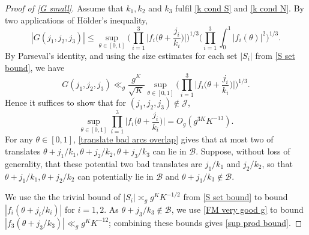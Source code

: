 \documentclass[hidelinks,11pt,reqno]{amsart}
\renewcommand{\leq}{\leqslant}
\newcommand{\fewnz}{\mathcal{B}}
\theoremstyle{remark}
\begin{document}
\begin{proof}[Proof of \cref{G small}]
    Assume that $k_{1},k_{2}$ and $k_{3}$ fulfil \cref{k cond S} and \cref{k cond N}. By two applications of H\"{o}lder's inequality, 
  \[|G(j_{1},j_{2},j_{3})|\leq \sup_{\theta\in [0,1]}\Big (\prod_{i=1}^{3}\Big |f_{i}\Big (\theta+\frac{j_{i}}{k_{i}}\Big ) \Big |\Big )^{1/3}\Big (\prod_{i=1}^{3}\int_{0}^{1}|f_{i}(\theta)|^{2} \Big)^{1/3}.\]
By Parseval's identity, and using the size estimates for each set $|S_{i}|$ from \cref{S set bound}, we have
\[G(j_{1},j_{2},j_{3})\ll_{g} \frac{g^{K}}{\sqrt{K}} \sup_{\theta\in [0,1]}\Big (\prod_{i=1}^{3}\Big |f_{i}\Big (\theta+\frac{j_{i}}{k_{i}}\Big ) \Big |\Big )^{1/3}. \]
Hence it suffices to show that for $(j_{1},j_{2},j_{3})\notin \mathcal{J}$, 
\begin{equation}\label{sup prod bound}
    \sup_{\theta\in [0,1]}\prod_{i=1}^{3}\Big |f_{i}\Big (\theta+\frac{j_{i}}{k_{i}}\Big ) \Big |=O_{g}(g^{3K}K^{-13}).
\end{equation}
For any $\theta\in [0,1]$, \cref{translate bad arcs overlap} gives that at most two of translates $\theta+j_{1}/k_{1},\theta+j_{2}/k_{2},\theta+j_{3}/k_{3}$ can lie in $\fewnz$. Suppose, without loss of generality, that these potential two bad translates are $j_{1}/k_{1}$ and $j_{2}/k_{2}$, so that $\theta+j_{1}/k_{1},\theta+j_{2}/k_{2}$ can potentially lie in $\mathcal{B}$ and $\theta+j_{3}/k_{3}\notin \mathcal{B}$.

We use the the trivial bound of $|S_{i}|\asymp_{g} g^{K}K^{-1/2}$ from \cref{S set bound} to bound $|f_{i}(\theta+j_{i}/k_{i})|$ for $i=1,2$. As $\theta+j_{3}/k_{3}\notin \mathcal{B}$, we use \cref{FM very good g} to bound ${|f_{3}(\theta +j_{3}/k_{3})|\ll_{g} g^{K}K^{-12}}$; combining these bounds gives \cref{sup prod bound}.
\end{proof} 
\end{document}
